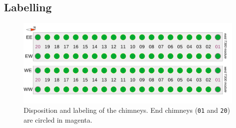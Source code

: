 \subsection{Labelling}
\label{ssec:labelling}

\begin{figure}
  \includegraphics[width=\textwidth,clip,trim=0 35 0 10]{fig/ChimneyMap}
  \caption{\label{fig:ChimneyLabelling}
    Disposition and labeling of the chimneys. End chimneys (\texttt{01} and
    \texttt{20}) are circled in magenta.
  }
\end{figure}

